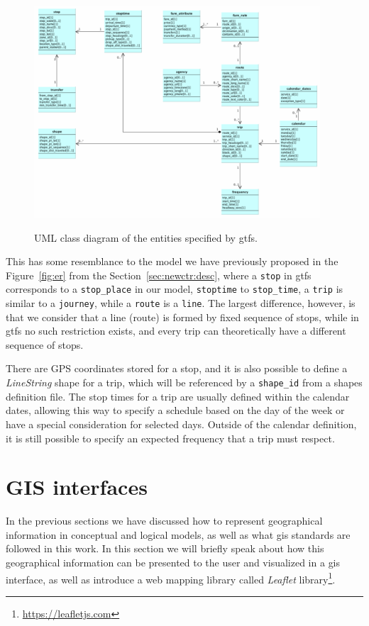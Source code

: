     \begin{figure}[ht]
		\begin{center}
			{\includegraphics[width=0.95\textwidth]{figures/gtfs.png}}
		\end{center}
		\caption{UML class diagram of the entities specified by \acrshort{gtfs}.}
		\label{fig:gis:gtfs}
	\end{figure}
	
	This has some resemblance to the model we have previously proposed in the Figure~\ref{fig:er} from the Section~\ref{sec:newctr:desc}, where a \texttt{stop} in \gls{gtfs} corresponds to a \texttt{stop\_place} in our model, \texttt{stoptime} to \texttt{stop\_time}, a \texttt{trip} is similar to a \texttt{journey}, while a \texttt{route} is a \texttt{line}. The largest difference, however, is that we consider that a line (route) is formed by fixed sequence of stops, while in \gls{gtfs} no such restriction exists, and every trip can theoretically have a different sequence of stops.
	
	There are GPS coordinates stored for a stop, and it is also possible to define a \textit{LineString} shape for a trip, which will be referenced by a \texttt{shape\_id} from a shapes definition file. The stop times for a trip are usually defined within the calendar dates, allowing this way to specify a schedule based on the day of the week or have a special consideration for selected days. Outside of the calendar definition, it is still possible to specify an expected frequency that a trip must respect.
    
    \section{GIS interfaces}
	In the previous sections we have discussed how to represent geographical information in conceptual and logical models, as well as what \gls{gis} standards are followed in this work. In this section we will briefly speak about how this geographical information can be presented to the user and visualized in a \gls{gis} interface, as well as introduce a web mapping library called {\em Leaflet} library\footnote{\url{https://leafletjs.com}}.
    
